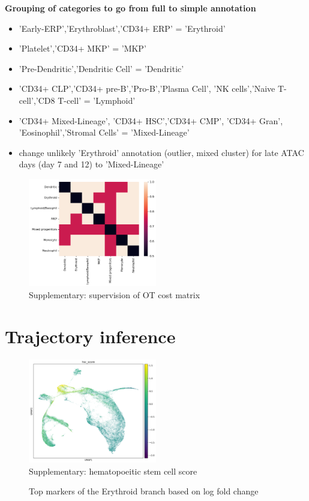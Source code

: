 \documentclass[a4paper]{article}
\begin{document}
\textbf{Grouping of categories to go from full to simple annotation}
\begin{itemize}
  \item 'Early-ERP','Erythroblast','CD34+ ERP' = 'Erythroid'
  \item 'Platelet','CD34+ MKP' = 'MKP'
  \item 'Pre-Dendritic','Dendritic Cell' = 'Dendritic'
  \item 'CD34+ CLP','CD34+ pre-B','Pro-B','Plasma Cell', 'NK cells','Naive T-cell','CD8 T-cell' = 'Lymphoid'
  \item 'CD34+ Mixed-Lineage', 'CD34+ HSC','CD34+ CMP', 'CD34+ Gran', 'Eosinophil','Stromal Cells' = 'Mixed-Lineage'
  \item change unlikely 'Erythroid' annotation (outlier, mixed cluster) for late ATAC days (day 7 and 12) to 'Mixed-Lineage'
\end{itemize}

\begin{figure}[!htb]
  \centering
  \includegraphics[width=0.5\textwidth]{../figures/hematopoiesis/integration_supervision.png}
  \caption{Supplementary: supervision of OT cost matrix}
\end{figure}

\FloatBarrier
\section{Trajectory inference}

\begin{figure}[!htb]
  \centering
  \includegraphics[width=0.5\textwidth]{../figures/hematopoiesis/integrated_hsc_score.png}
  \caption{Supplementary: hematopoeitic stem cell score}
\end{figure}

\begin{figure}[!htb]
  \centering
  \caption{Top markers of the Erythroid branch based on log fold change}
\end{figure}
\end{document}
